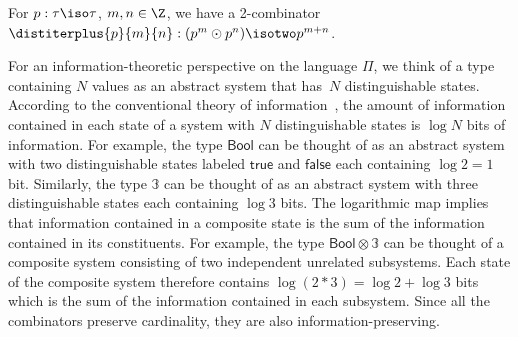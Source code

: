 \begin{lemma}
\label{lem:distiterplus}
  For $p : \tau\iso\tau$, $m,n\in\Z$, we have a 2-combinator
  $\distiterplus{p}{m}{n} : (p^m \odot p^n) \isotwo p ^{m + n}$.
\end{lemma}

For an information-theoretic perspective on the language $\Pi$, we
think of a type containing $N$ values as an abstract system that
has~$N$ distinguishable states. According to the conventional theory
of information~\cite{Shannon1948}, the amount of information contained
in each state of a system with $N$ distinguishable states is $\log N$
bits of information. For example, the type $\mathsf{Bool}$ can be
thought of as an abstract system with two distinguishable states
labeled $\mathsf{true}$ and $\mathsf{false}$ each containing
$\log 2 = 1$ bit. Similarly, the type $\mathbb{3}$ can be thought of
as an abstract system with three distinguishable states each
containing $\log 3$ bits. The logarithmic map implies that information
contained in a composite state is the sum of the information contained
in its constituents. For example, the type
$\mathsf{Bool} \otimes \mathbb{3}$ can be thought of a composite
system consisting of two independent unrelated subsystems. Each state
of the composite system therefore contains
$\log (2 * 3) = \log 2 + \log 3$ bits which is the sum of the
information contained in each subsystem. Since all the combinators
preserve cardinality, they are also information-preserving.


